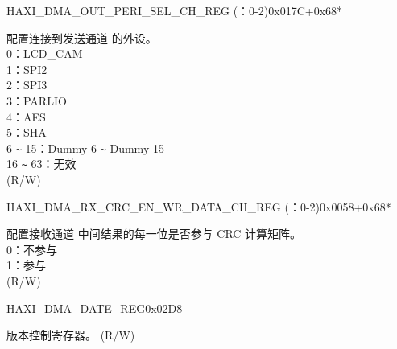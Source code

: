\begin{register}{H}{AXI\_DMA\_OUT\_PERI\_SEL\_CH\_REG (：0-2)}{0x017C+0x68*}\label{regdesc:AXIDMAOUTPERISELCHNREG}
%
%
\regnewline%
\begin{regdesc}\begin{reglist}
\label{fielddesc:AXIDMAPERIOUTSELCHN}\item [AXI\_DMA\_PERI\_OUT\_SEL\_CH\regindex{n}] 配置连接到发送通道  的外设。\\
0：LCD\_CAM\\
1：SPI2\\
2：SPI3\\
3：PARLIO\\
4：AES\\
5：SHA\\
6 \verb+~+ 15：Dummy-6 \verb+~+ Dummy-15\\
16 \verb+~+ 63：无效\\
(R/W)
\end{reglist}\end{regdesc}
\end{register}


\begin{register}{H}{AXI\_DMA\_RX\_CRC\_EN\_WR\_DATA\_CH\_REG (：0-2)}{0x0058+0x68*}\label{regdesc:AXIDMARXCRCENWRDATACHNREG}
%
\regnewline%
\begin{regdesc}\begin{reglist}
\label{fielddesc:AXIDMARXCRCENWRDATACHN}\item [AXI\_DMA\_RX\_CRC\_EN\_WR\_DATA\_CH\regindex{n}] 配置接收通道  中间结果的每一位是否参与 CRC 计算矩阵。\\
0：不参与\\
1：参与\\ (R/W)
\end{reglist}\end{regdesc}
\end{register}


\begin{register}{H}{AXI\_DMA\_DATE\_REG}{0x02D8}\label{regdesc:AXIDMADATEREG}
%
\regnewline%
\begin{regdesc}\begin{reglist}
\label{fielddesc:AXIDMADATE}\item [AXI\_DMA\_DATE] 版本控制寄存器。 (R/W)
\end{reglist}\end{regdesc}
\end{register}
